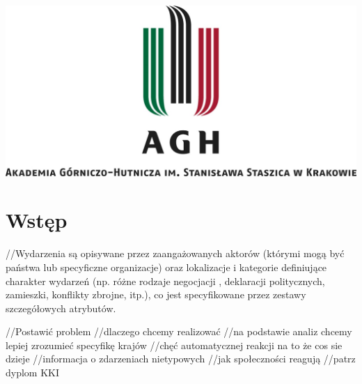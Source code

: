 \documentclass[11pt]{report}
\begin{document}
    \begin{titlepage}
        \centering
        \includegraphics[width=\linewidth]{fig/AGH.jpg}
        \vspace{0.03\textheight}
        \bigskip
        \vspace{0.2\textheight}
        \par

        \vspace{0.1\textheight}
    \end{titlepage}

    \tableofcontents


    \chapter{Wstęp}
    //Wydarzenia są opisywane przez zaangażowanych aktorów (którymi mogą być państwa lub specyficzne organizacje) oraz lokalizacje i kategorie definiujące charakter wydarzeń (np. różne rodzaje negocjacji , deklaracji politycznych, zamieszki, konflikty zbrojne, itp.), co jest specyfikowane przez zestawy szczegółowych atrybutów.

    //Postawić problem
    //dlaczego chcemy realizować
    //na podstawie analiz chcemy lepiej zrozumieć specyfikę krajów
    //chęć automatycznej reakcji na to że cos sie dzieje
    //informacja o zdarzeniach nietypowych
    //jak społeczności reagują
    //patrz dyplom KKI
\end{document}
